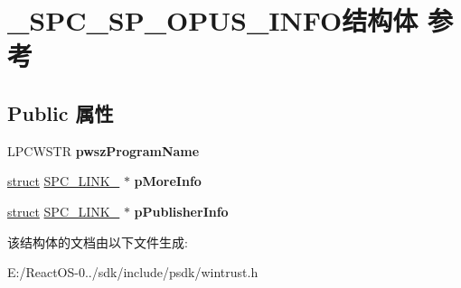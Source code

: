 \hypertarget{struct___s_p_c___s_p___o_p_u_s___i_n_f_o}{}\section{\+\_\+\+S\+P\+C\+\_\+\+S\+P\+\_\+\+O\+P\+U\+S\+\_\+\+I\+N\+F\+O结构体 参考}
\label{struct___s_p_c___s_p___o_p_u_s___i_n_f_o}
\subsection*{Public 属性}
\begin{DoxyCompactItemize}
\item 
\mbox{\label{struct___s_p_c___s_p___o_p_u_s___i_n_f_o_ac425d596aa1636807e880493bed0c397}} 
L\+P\+C\+W\+S\+TR {\bfseries pwsz\+Program\+Name}
\item 
\mbox{\label{struct___s_p_c___s_p___o_p_u_s___i_n_f_o_a6796cbd4544f5d82c0c848fc51b1ae3e}} 
\hyperlink{interfacestruct}{struct} \hyperlink{struct_s_p_c___l_i_n_k__}{S\+P\+C\+\_\+\+L\+I\+N\+K\+\_\+} $\ast$ {\bfseries p\+More\+Info}
\item 
\mbox{\label{struct___s_p_c___s_p___o_p_u_s___i_n_f_o_a3905da8c8aeb9a07f8cab5a9da409891}} 
\hyperlink{interfacestruct}{struct} \hyperlink{struct_s_p_c___l_i_n_k__}{S\+P\+C\+\_\+\+L\+I\+N\+K\+\_\+} $\ast$ {\bfseries p\+Publisher\+Info}
\end{DoxyCompactItemize}


该结构体的文档由以下文件生成\+:\begin{DoxyCompactItemize}
\item 
E\+:/\+React\+O\+S-\/0../sdk/include/psdk/wintrust.\+h\end{DoxyCompactItemize}
